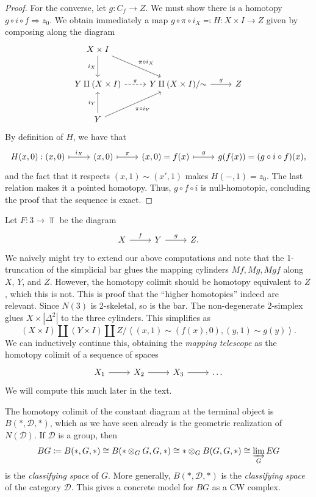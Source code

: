 \begin{proof}
	For the converse, let $g : C_f \to Z$. We must show there is a homotopy $g\circ i\circ f\Rightarrow z_0$. We obtain immediately a map $g\circ \pi\circ i_X \eqqcolon H : X\times I \to Z$ given by composing along the diagram
	\[\begin{tikzcd}[row sep = 2.5em, column sep = 2.5em]
	X\times I\ar[" i_X "', d] \ar[" \pi \circ i_X ", dr]  &  &  \\
	Y\amalg (X\times I)\ar[" \pi ", dashed, r]  & Y\amalg (X\times I) /\tildesim \ar[" g ", r] & Z \\
	Y\ar[" i_Y ", u] \ar[" \pi \circ i_Y "', ur]  &  & 
	\end{tikzcd}\]
	By definition of $H$, we have that
	\[\begin{tikzcd}[row sep = 2.5em, column sep = 2.5em]
		H(x,0) : (x,0)\ar[" i_X ", mapsto, r]  & (x,0)\ar[" \pi ", mapsto, r]  & (x,0)=f(x)\ar[" g ", mapsto, r] & g(f(x))=(g\circ i\circ f)(x),
	\end{tikzcd}\]
	and the fact that it respects $(x,1)\sim (x',1)$ makes $H(-,1)=z_0$. The last relation makes it a pointed homotopy. Thus, $g\circ f\circ i$ is null-homotopic, concluding the proof that the sequence is exact.
\end{proof}

Let $F : 3 \to \Top $ be the diagram
\[\begin{tikzcd}[row sep = 2.5em, column sep = 2.5em]
X\ar[" f ", r]  & Y\ar[" g ", r]  & Z.
\end{tikzcd}\]
We naively might try to extend our above computations and note that the 1-truncation of the simplicial bar glues the mapping cylinders $Mf,Mg,Mgf$ along $X$, $Y$, and $Z$. However, the homotopy colimit should be homotopy equivalent to $Z$, which this is not. This is proof that the ``higher homotopies'' indeed are relevant. Since $N(3)$ is 2-skeletal, so is the bar. The non-degenerate 2-simplex glues $X\times \left| \Delta^2 \right| $ to the three cylinders. This simplifies as
\[
	(X\times I)\amalg (Y\times I)\amalg Z / \left\langle (x,1)\sim (f(x),0),(y,1)\sim g(y) \right\rangle 
.\]
We can inductively continue this, obtaining the \emph{mapping telescope} as the homotopy colimit of a sequence of spaces
\[\begin{tikzcd}[row sep = 2.5em, column sep = 2.5em]
X_1\ar[r]  & X_2\ar[r]  & X_3\ar[r]  & \ldots 
\end{tikzcd}\]
We will compute this much later in the text.

The homotopy colimit of the constant diagram at the terminal object is $B(*,\mathcal{D} ,*)$, which as we have seen already is the geometric realization of $N(\mathcal{D} )$. If $\mathcal{D} $ is a group, then
\[
	BG\coloneqq B(*,G,*)\cong B(*\otimes _GG,G,*)\cong *\otimes _GB(G,G,*)\cong \varinjlim _GEG
\]
is the \emph{classifying space} of $G$. More generally, $B(*,\mathcal{D} ,*)$ is the \emph{classifying space} of the category $\mathcal{D} $. This gives a concrete model for $BG$ as a CW complex.

